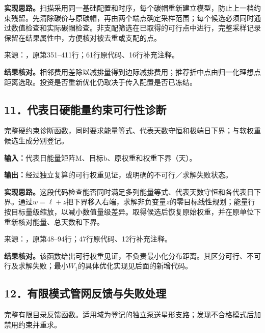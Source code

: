 \noindent\textbf{实现思路。}扫描采用同一基础配置和时序，每个碳帽重新建立模型，防止上一档约束残留。先清除碳价与原碳帽，再由两个端点确定采样范围；每个候选必须同时通过数值检查和实际碳帽检查。非支配筛选在已取得的可行点中进行，完整采样记录保留在结果属性中，方便核对被去重或支配的点。

{\small 来源：，原第351--411行；61行原代码、16行补充注释。}\par

\begingroup
{}

\endgroup

\noindent\textbf{结果核对。}相邻费用差除以减排量得到边际减排费用；推荐折中点由归一化理想点距离选取。投资是否重新优化仍取决于传入配置是否已冻结。

\subsection*{11．代表日硬能量约束可行性诊断}
完整硬约束诊断函数，同时要求能量等式、代表天数守恒和极端日下界；与软权重候选生成分别登记。

\noindent\textbf{输入：}代表日能量矩阵M、目标b、原权重和权重下界（天）。\par
\noindent\textbf{输出：}经过独立复算的可行权重见证，或明确的不可行／求解失败状态。\par

\noindent\textbf{实现思路。}这段代码检查能否同时满足多列能量等式、代表天数守恒和各代表日下界。通过$w=\ell+z$把下界移入右端，求解非负变量$z$的零目标线性规划；能量行按目标量级缩放，以减小数值量级差异。取得候选后恢复原始权重，并在原单位下重新核对能量、总天数和下界。

{\small 来源：，原第48--94行；47行原代码、12行补充注释。}\par

\begingroup
{}

\endgroup

\noindent\textbf{结果核对。}该函数给出可行权重见证，不负责最小化分布距离。其区分可行、不可行及求解失败；最小$W_1$的具体优化实现见后面的新增代码。

\subsection*{12．有限模式管网反馈与失败处理}
完整有限目录反馈函数。适用域为登记的独立泵送星形支路；发现不合格模式后加禁用约束并重求。

